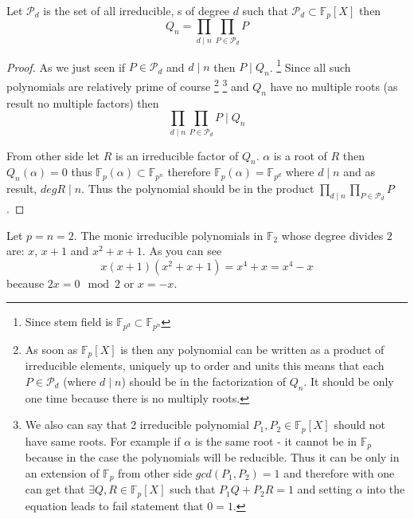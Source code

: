 \begin{corollary}
  Let $\mathcal{P}_d$ is the set of all irreducible,
  s of degree $d$ such that
  $\mathcal{P}_d \subset \mathbb{F}_p\left[X\right]$ then 
  \[
  Q_n = \prod_{d \mid n} \prod_{P \in \mathcal{P}_d} P
  \]
  \begin{proof}
    As we just seen if $P \in \mathcal{P}_d$ and $d \mid n$ then
    $P \mid Q_n$.
    \footnote{
      Since stem field is $\mathbb{F}_{p^d} \subset \mathbb{F}_{p^n}$ 
    }
    Since all such polynomials are relatively prime of course
    \footnote{
      As soon as $\mathbb{F}_p\left[X\right]$ is 
      then any polynomial can be written as a product of irreducible
      elements, uniquely up to order and units this means that each
      $P \in \mathcal{P}_d$ (where $d \mid n$) should be in the
      factorization of $Q_n$. It should be only one time because there
      is no multiply roots. 
    }
    \footnote{
      We also can say that 2 irreducible polynomial
      $P_1, P_2 \in \mathbb{F}_p\left[X\right]$ should not have same
      roots. For example if $\alpha$ is the same root - it cannot be
      in $\mathbb{F}_p$ because in the case the polynomials will be
      reducible. Thus it can be only in an extension of $\mathbb{F}_p$
      from other side $gcd(P_1,P_2) = 1$ and therefore with
       one can get that $\exists Q,R \in
      \mathbb{F}_p\left[X\right]$ such that
      \(
      P_1 Q + P_2 R = 1
      \) and setting $\alpha$ into the equation leads to fail
      statement that $0 = 1$.
      }
    and $Q_n$ have no multiple roots (as result no multiple factors) 
    then
    \[
    \prod_{d \mid n} \prod_{P \in \mathcal{P}_d} P \mid Q_n
    \]

    From other side let $R$ is an irreducible factor of $Q_n$.
    $\alpha$ is a root of $R$ then $Q_n\left(\alpha\right) = 0$ thus
    $\mathbb{F}_p\left(\alpha\right) \subset \mathbb{F}_{p^n}$
    therefore $\mathbb{F}_p\left(\alpha\right) = \mathbb{F}_{p^d}$
    where $d \mid n$ and as result, $deg R \mid n$. Thus the
    polynomial should be in the product
    $\prod_{d \mid n} \prod_{P \in \mathcal{P}_d} P$.
  \end{proof}
\end{corollary}

\begin{example}
  Let $p = n = 2$. The monic irreducible polynomials in $\mathbb{F}_2$
  whose degree divides $2$ are: $x$, $x+1$ and $x^2 +x + 1$.
  As you can see
  \begin{equation}
    x\left(x+1\right)\left(x^2+x+1\right) = x^4 + x = x^4 - x
    \nonumber
  \end{equation}
  because $2x = 0 \mod 2$ or $x = -x$.
\end{example}

